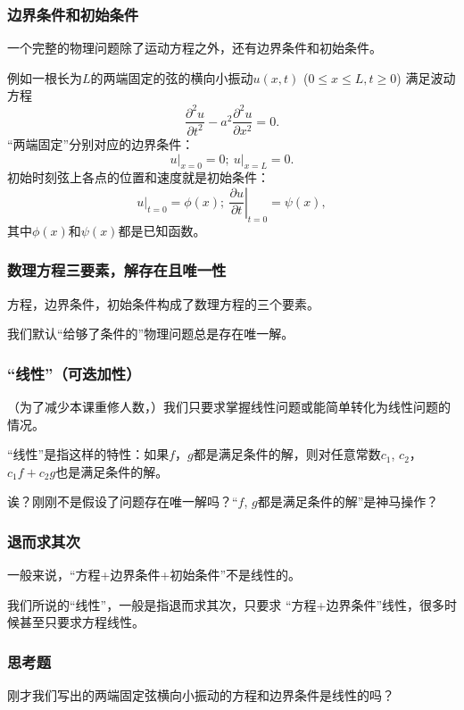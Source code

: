 \documentclass[CJK]{beamer}
\begin{document}
\begin{frame}
  \frametitle{边界条件和初始条件}
  一个完整的物理问题除了运动方程之外，还有边界条件和初始条件。

  例如一根长为$L$的两端固定的弦的横向小振动$u(x, t)$ ($0\le x\le L, t\ge 0$) 满足波动方程
  $$\frac{\partial^2u}{\partial t^2} - a^2\frac{\partial^2u}{\partial x^2} = 0 .$$
  “两端固定”分别对应的边界条件：
  $$ \left.u\right\vert_{x=0} = 0;\ \left.u\right\vert_{x=L} = 0.$$
  初始时刻弦上各点的位置和速度就是初始条件：
  $$ \left.u\right\vert_{t=0} = \phi(x);\ \left.\frac{\partial u}{\partial t}\right\vert_{t=0} = \psi(x),$$
  其中$\phi(x)$和$\psi(x)$都是已知函数。
\end{frame}

\begin{frame}
  \frametitle{数理方程三要素，解存在且唯一性}
  
  {\blue 方程，边界条件，初始条件构成了数理方程的三个要素。}

  \skipline

  我们默认“给够了条件的”物理问题总是存在唯一解。
\end{frame}


\begin{frame}
  \frametitle{“线性”（可迭加性）}
  （为了减少本课重修人数，）{\blue 我们只要求掌握线性问题或能简单转化为线性问题的情况。}

  “线性”是指这样的特性：如果$f$，$g$都是满足条件的解，则对任意常数$c_1$, $c_2$，$c_1f+c_2g$也是满足条件的解。


  诶？刚刚不是假设了问题存在唯一解吗？“$f$, $g$都是满足条件的解”是神马操作？
  
\end{frame}


\begin{frame}
  \frametitle{退而求其次}
一般来说，{\blue “方程+边界条件+初始条件”不是线性}的。

\skipline

我们所说的“线性”，一般是指退而求其次，只要求 {\blue “方程+边界条件”线性}，很多时候甚至只要求{\blue 方程线性}。

\end{frame}


\begin{frame}
  \frametitle{思考题}

  刚才我们写出的两端固定弦横向小振动的方程和边界条件是线性的吗？

\end{frame}
\end{document}
